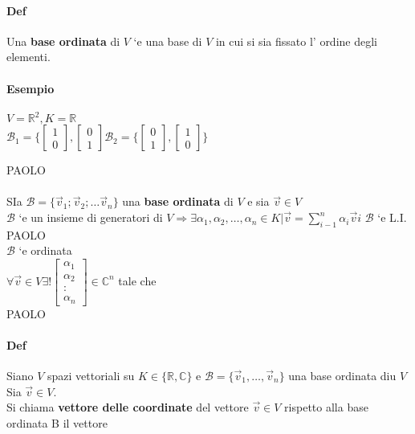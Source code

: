 \paragraph{Def} Una \textbf{base ordinata} di $V$ `e una base di $V$ in cui si sia fissato l' ordine degli elementi. 
\paragraph{Esempio} $V= \mathbb{R}^2, K=\mathbb{R}$\\
$
\mathcal{B}_1= \{ 
    \begin{bmatrix}
        1\\0
    \end{bmatrix}
    ,
    \begin{bmatrix}
        0\\1
    \end{bmatrix}
\mathcal{B}_2= \{ 
    \begin{bmatrix}
        0\\1
    \end{bmatrix}
    ,
    \begin{bmatrix}
        1\\0
    \end{bmatrix}
\}$

PAOLO\\\\
SIa $\mathcal{B}=\{\vec{v}_1;\vec{v}_2;\dots\vec{v}_n\}$ una \textbf{base ordinata} di $V$ e sia $\vec{v}\in V$\\
$\mathcal{B}$ `e un insieme di generatori di $V\Longrightarrow \exists\alpha_1,\alpha_2,\dots,\alpha_n\in K\Big|\vec{v}
=\sum_{i-1}^{n}\alpha_i\vec{v}i$
$\mathcal{B}$ `e L.I. \\
PAOLO\\
$\mathcal{B}$ `e ordinata \\
\large{
    $\forall \vec{v}\in V \exists!
    \begin{bmatrix}
        \alpha_1\\
        \alpha_2\\
        :\\
        \alpha_n
    \end{bmatrix}
    \in\mathbb{C}^n $
}
tale che \\
PAOLO\\

\paragraph{Def}
Siano $V$ spazi vettoriali su $K \in\{\mathbb{R}, \mathbb{C}\}$ e $\mathcal{B}=\{\vec{v}_1, \dots, \vec{v}_n\}$ una base ordinata diu $V$\\
Sia $\vec{v}\in V$.\\
Si chiama \textbf{vettore delle coordinate} del vettore $\vec{v}\in V$ rispetto alla base ordinata B il vettore 

